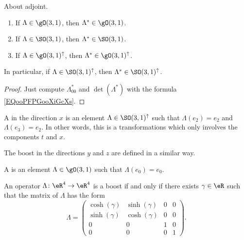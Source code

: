 \begin{lemma}       \label{LEMooLJMMooOXCyOl}
    About adjoint.
    \begin{enumerate}
        \item
            If \( \Lambda\in \gO(3,1)\), then \( \Lambda^*\in \gO(3,1)\).
        \item
            If \( \Lambda\in \SO(3,1)\), then \( \Lambda^*\in \SO(3,1)\).
        \item
            If \( \Lambda\in \gO(3,1)^{\uparrow}\), then \( \Lambda^*\in \gO(3,1)^{\uparrow}\).
    \end{enumerate}
    In particular, if \( \Lambda\in \SO(3,1)^{\uparrow}\), then \( \Lambda^*\in \SO(3,1)^{\uparrow}\).
\end{lemma}

\begin{proof}
    Just compute \( \Lambda^*_{00}\) and \( \det(\Lambda^*)\) with the formula \eqref{EQooPFPGooXiGcXs}.
\end{proof}

\begin{definition}          \label{DEFooVQLPooWyINoc}
    A  in the direction \( x\) is an element \( \Lambda\in \SO(3,1)^{\uparrow}\) such that \( \Lambda(e_2)=e_2\) and \( \Lambda(e_3)=e_2\). In other words, this is a transformations which only involves the components \( t\) and \( x\).

    The boost in the directions \( y\) and \( z\) are defined in a similar way.

    A  is an element \( \Lambda\in \gO(3,1)\) such that \( \Lambda(e_0)=e_0\).
\end{definition}

\begin{lemma}
    An operator \( \Lambda\colon \eR^4\to \eR^4\) is a boost if and only if there exists \( \gamma\in \eR\) such that the matrix of \( \Lambda\) has the form 
    \begin{equation}
        \Lambda=\begin{pmatrix}
             \cosh(\gamma)   &   \sinh(\gamma)    &   0    &   0    \\
             \sinh(\gamma)   &   \cosh(\gamma)    &   0    &   0    \\
             0   &   0    &   1    &   0    \\ 
             0   &   0    &   0    &   1     
         \end{pmatrix}.
    \end{equation}
\end{lemma}

